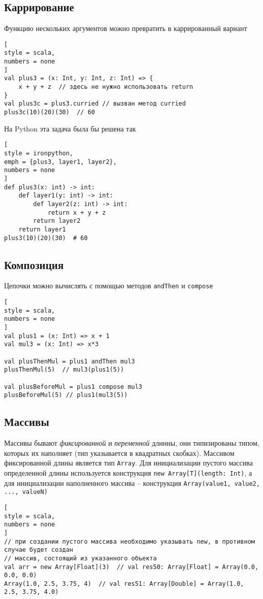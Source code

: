 \documentclass[%
	11pt,
	a4paper,
	utf8,
		]{article}
\begin{document}
\subsection{Каррирование}

Функцию нескольких аргументов можно превратить в каррированный вариант
\begin{lstlisting}[
style = scala,
numbers = none	
]
val plus3 = (x: Int, y: Int, z: Int) => {
    x + y + z  // здесь не нужно использовать return 
}
val plus3c = plus3.curried // вызван метод curried
plus3c(10)(20)(30)  // 60
\end{lstlisting}

На Python эта задача была бы решена так
\begin{lstlisting}[
style = ironpython,
emph = {plus3, layer1, layer2},
numbers = none	
]
def plus3(x: int) -> int:
    def layer1(y: int) -> int:
        def layer2(z: int) -> int:
            return x + y + z
        return layer2
    return layer1
plus3(10)(20)(30)  # 60
\end{lstlisting}

\subsection{Композиция}

Цепочки можно вычислять с помощью методов \texttt{andThen} и \texttt{compose}
\begin{lstlisting}[
style = scala,
numbers = none	
]
val plus1 = (x: Int) => x + 1
val mul3 = (x: Int) => x*3

val plusThenMul = plus1 andThen mul3
plusThenMul(5)  // mul3(plus1(5))

val plusBeforeMul = plus1 compose mul3
plusBeforeMul(5) // plus1(mul3(5))
\end{lstlisting}

\subsection{Массивы}

Массивы бывают \emph{фиксированной} и \emph{переменной} длинны, они типизированы типом, которых их наполняет (тип указывается в квадратных скобках). Массивом фиксированной длины является тип \texttt{Array}. Для инициализации пустого массива определенной длины используется конструкция \lstinline{new Array[T](length: Int)}, а для инициализации наполненного массива -- конструкция \lstinline{Array(value1, value2, ..., valueN)}
\begin{lstlisting}[
style = scala,
numbers = none
]
// при создании пустого массива необходимо указывать new, в противном случае будет создан
// массив, состоящий из указанного объекта 
val arr = new Array[Float](3)  // val res50: Array[Float] = Array(0.0, 0.0, 0.0)
Array(1.0, 2.5, 3.75, 4)  // val res51: Array[Double] = Array(1.0, 2.5, 3.75, 4.0)
\end{lstlisting}
\end{document}
